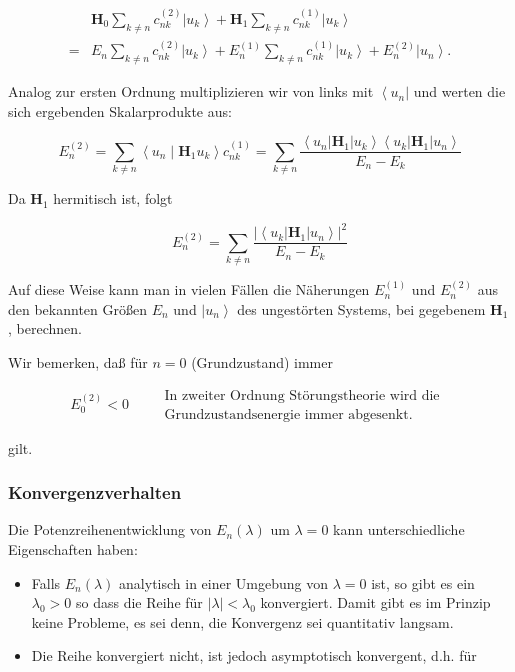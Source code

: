 \documentclass[10pt, letterpaper]{article}
\begin{document}
$$
\begin{aligned}
& \mathbf{H}_{0} \sum_{k \neq n} c_{n k}^{(2)}\left|u_{k}\right\rangle+\mathbf{H}_{1} \sum_{k \neq n} c_{n k}^{(1)}\left|u_{k}\right\rangle \\
= & E_{n} \sum_{k \neq n} c_{n k}^{(2)}\left|u_{k}\right\rangle+E_{n}^{(1)} \sum_{k \neq n} c_{n k}^{(1)}\left|u_{k}\right\rangle+E_{n}^{(2)}\left|u_{n}\right\rangle .
\end{aligned}
$$

Analog zur ersten Ordnung multiplizieren wir von links mit $\left\langle u_{n}\right|$ und werten die sich ergebenden Skalarprodukte aus:

$$
E_{n}^{(2)}=\sum_{k \neq n}\left\langle u_{n} \mid \mathbf{H}_{1} u_{k}\right\rangle c_{n k}^{(1)}=\sum_{k \neq n} \frac{\left\langle u_{n}\right| \mathbf{H}_{1}\left|u_{k}\right\rangle\left\langle u_{k}\right| \mathbf{H}_{1}\left|u_{n}\right\rangle}{E_{n}-E_{k}}
$$

Da $\mathbf{H}_{1}$ hermitisch ist, folgt

$$
E_{n}^{(2)}=\sum_{k \neq n} \frac{\left.\left|\left\langle u_{k}\right| \mathbf{H}_{1}\right| u_{n}\right\rangle\left.\right|^{2}}{E_{n}-E_{k}}
$$

Auf diese Weise kann man in vielen Fällen die Näherungen $E_{n}^{(1)}$ und $E_{n}^{(2)}$ aus den bekannten Größen $E_{n}$ und $\left|u_{n}\right\rangle$ des ungestörten Systems, bei gegebenem $\mathbf{H}_{1}$, berechnen.

Wir bemerken, daß für $n=0$ (Grundzustand) immer

$$
E_{0}^{(2)}<0 \quad \begin{aligned}
& \text { In zweiter Ordnung Störungstheorie wird die } \\
& \text { Grundzustandsenergie immer abgesenkt. }
\end{aligned}
$$

gilt.

\subsubsection*{Konvergenzverhalten}
Die Potenzreihenentwicklung von $E_{n}(\lambda)$ um $\lambda=0$ kann unterschiedliche Eigenschaften haben:

\begin{itemize}
  \item Falls $E_{n}(\lambda)$ analytisch in einer Umgebung von $\lambda=0$ ist, so gibt es ein $\lambda_{0}>0$ so dass die Reihe für $|\lambda|<\lambda_{0}$ konvergiert. Damit gibt es im Prinzip keine Probleme, es sei denn, die Konvergenz sei quantitativ langsam.
  \item Die Reihe konvergiert nicht, ist jedoch asymptotisch konvergent, d.h. für
\end{itemize}
\end{document}
